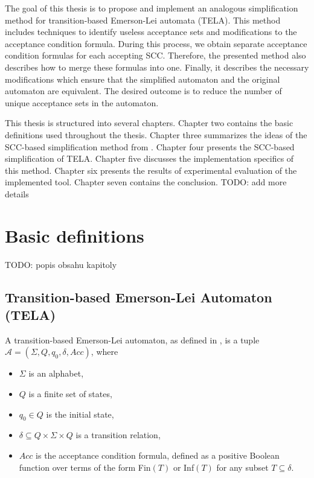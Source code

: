 \documentclass[
  digital, %
  twoside, %
  table,   %
  lof,     %
  lot,     %
]{fithesis3}
\begin{document}
The goal of this thesis is to propose and implement an analogous simplification method for transition-based Emerson-Lei automata (TELA). This method includes techniques to identify useless acceptance sets and modifications to the acceptance condition formula. During this process, we obtain separate acceptance condition formulas for each accepting SCC. Therefore, the presented method also describes how to merge these formulas into one. Finally, it describes the necessary modifications which ensure that the simplified automaton and the original automaton are equivalent. The desired outcome is to reduce the number of unique acceptance sets in the automaton. 

This thesis is structured into several chapters. Chapter two contains the basic definitions used throughout the thesis. Chapter three summarizes the ideas of the SCC-based simplification method from \cite{spin2013}.  Chapter four presents the SCC-based simplification of TELA. Chapter five discusses the implementation specifics of this method. Chapter six presents the results of experimental evaluation of the implemented tool. Chapter seven contains the conclusion. TODO: add more details

\chapter{Basic definitions}
\label{chap:basic_definitions}
TODO: popis obsahu kapitoly

\section{Transition-based Emerson-Lei Automaton (TELA)} 
\label{sec:tela}
A transition-based Emerson-Lei automaton, as defined in \cite{bloemen2017}, is a tuple $\mathcal{A} = (\Sigma, Q, q_0, \delta, Acc)$, where
\begin{itemize}
  \item $\Sigma$ is an alphabet,
  \item $Q$ is a finite set of states,
  \item $q_0 \in Q$ is the initial state,
  \item $\delta \subseteq Q \times \Sigma \times Q$ is a transition relation,
  \item $Acc$ is the acceptance condition formula, defined as a positive Boolean function over terms of the form Fin$(T)$ or Inf$(T)$ for any subset $T \subseteq \delta$. %
\end{itemize}
\end{document}
